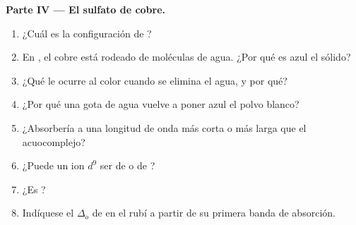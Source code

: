 \begin{problem}
\medskip
\noindent\textbf{Parte IV --- El sulfato de cobre.}
\begin{enumerate}[resume]
  \item ¿Cuál es la configuración de ?
  \item En , el cobre está rodeado de moléculas de agua. ¿Por qué es azul el sólido?
  \item ¿Qué le ocurre al color cuando se elimina el agua, y por qué?
  \item ¿Por qué una gota de agua vuelve a poner azul el polvo blanco?
  \item ¿Absorbería  a una longitud de onda más corta o más larga que el acuocomplejo?
  \item ¿Puede un ion $d^9$ ser de  o de ?
  \item ¿Es  ?
  \item Indíquese el $\Delta_o$ de  en el rubí a partir de su primera banda de absorción.
\end{enumerate}
\end{problem}
